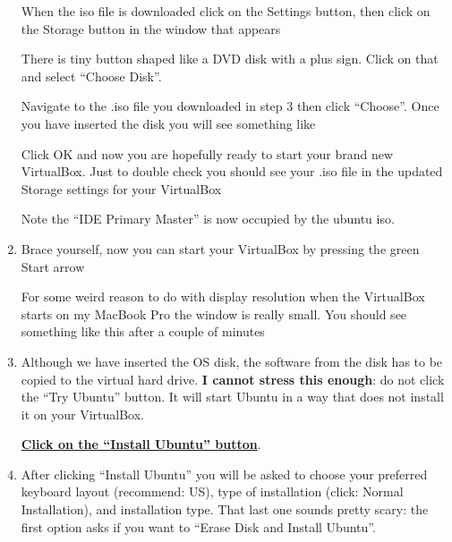 \begin{enumerate}[start=1,label={\bfseries Step \#\arabic*:}]
    When the iso file is downloaded click on the Settings button, then click on the Storage button in the window that appears
    
   
    There is tiny button shaped like a DVD disk with a plus sign. Click on that and select ``Choose Disk''. 
    
  
    Navigate to the .iso file you downloaded in step 3 then click ``Choose''. Once you have inserted the disk you will see something like
    
    
    Click OK and now you are hopefully ready to start your brand new VirtualBox. Just to double check you should see your .iso file in the updated Storage settings for your VirtualBox
    
    
    Note the ``IDE Primary Master'' is now occupied by the ubuntu iso.
    
    \item Brace yourself, now you can start your VirtualBox by pressing the green Start arrow
    
    For some weird reason to do with display resolution when the VirtualBox starts on my MacBook Pro the window is really small. You should see something like this after a couple of minutes
    
    
    \item Although we have inserted the OS disk, the software from the disk has to be copied to the virtual hard drive. 
    {\bf I cannot stress this enough}: do not click the ``Try Ubuntu'' button. It will start Ubuntu in a way that does not install it on your VirtualBox. 
    
    \begin{center}\underline{\bf Click on the ``Install Ubuntu'' button}. 
    \end{center}
    
    \newpage
    \item After clicking ``Install Ubuntu'' you will be asked to choose your preferred keyboard layout (recommend: US), type of installation (click: Normal Installation), and installation type. That last one sounds pretty scary: the first option asks if you want to ``Erase Disk and Install Ubuntu''. 
    

\end{enumerate}
